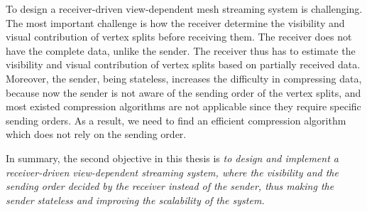     To design a receiver-driven view-dependent mesh streaming
    system is challenging. The most important
    challenge is how the receiver determine the visibility and visual contribution
    of vertex splits before receiving them. The receiver does not have
    the complete data, unlike the sender. The receiver thus has to estimate
    the visibility and visual contribution of vertex splits based on 
    partially received data. Moreover, the sender, being stateless, increases
    the difficulty in compressing data, because now the sender is not aware
    of the sending order of the vertex splits, and most existed compression algorithms
    are not applicable since they require specific sending orders.
    As a result, we need to find an efficient 
    compression algorithm which does not rely on the sending order.

    In summary, the second objective in this thesis is 
            \textit{to design and implement
            a receiver-driven view-dependent streaming system, where
            the visibility and the sending order decided by the receiver instead of the sender,
            thus making the sender stateless and improving the scalability of the system.}

